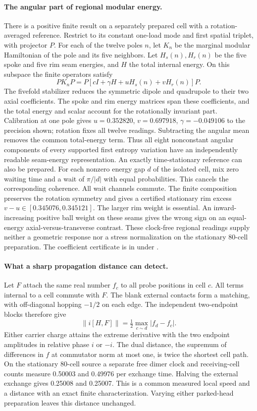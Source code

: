 \documentclass[11pt]{article}
\begin{document}
\paragraph{The angular part of regional modular energy.}
There is a positive finite result on a separately prepared cell with
a rotation-averaged reference. Restrict to its constant one-load mode
and first spatial triplet, with projector \(P\). For each of the twelve
poles \(n\), let \(K_n\) be the marginal modular Hamiltonian of the
pole and its five neighbors. Let \(H_s(n),H_r(n)\) be the five spoke
and five rim seam energies, and \(H\) the total internal energy.
On this subspace the finite operators satisfy
\[
 PK_nP=P[cI+\gamma H+uH_s(n)+vH_r(n)]P .
\]
The fivefold stabilizer reduces the symmetric dipole and quadrupole
to their two axial coefficients. The spoke and rim energy matrices
span these coefficients, and the total energy and scalar account for
the rotationally invariant part. Calibration at one pole gives
\(u=0.352820\), \(v=0.697918\), \(\gamma=-0.049106\) to the
precision shown; rotation fixes all twelve readings. Subtracting the
angular mean removes the common total-energy term. Thus all eight
nonconstant angular components of every supported first entropy
variation have an independently readable seam-energy representation.
An exactly time-stationary reference can also be prepared.
For each nonzero energy gap \(d\) of the isolated cell, mix zero
waiting time and a wait of \(\pi/|d|\) with equal probabilities. This
cancels the corresponding coherence. All wait channels commute. The
finite composition preserves the rotation symmetry and gives a
certified stationary rim excess \(v-u\in[0.345076,0.345121]\).
The larger rim weight is essential. An inward-increasing positive
ball weight on these seams gives the wrong sign on an equal-energy
axial-versus-transverse contrast. These clock-free regional readings
supply neither a geometric response nor a stress normalization on the
stationary 80-cell preparation.
The coefficient certificate is in 
under .

\paragraph{What a sharp propagation distance can detect.}
Let \(F\) attach the same real number \(f_c\) to all probe positions in
cell \(c\). All terms internal to a cell commute with \(F\).
The blank external contacts form a matching, with off-diagonal hopping
\(-1/2\) on each edge. The independent two-endpoint blocks therefore give
\[
 \|i[H,F]\|=\tfrac12\max_{c\sim d}|f_d-f_c|.
\]
Either carrier charge attains the extreme derivative with the two
endpoint amplitudes in relative phase \(i\) or \(-i\).
The dual distance, the supremum of differences in \(f\) at commutator
norm at most one, is twice the shortest cell path. On the stationary
80-cell source a separate free dimer clock and receiving-cell counts
measure 0.50003 and 0.49976 per exchange time. Halving the external
exchange gives 0.25008 and 0.25007. This is a common measured local
speed and a distance with an exact finite characterization. Varying
either parked-head preparation leaves this distance unchanged.
\end{document}
